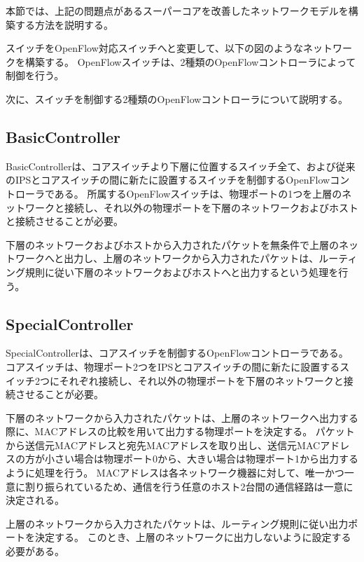 本節では、上記の問題点があるスーパーコアを改善したネットワークモデルを構築する方法を説明する。

スイッチをOpenFlow対応スイッチへと変更して、以下の図のようなネットワークを構築する。
OpenFlowスイッチは、2種類のOpenFlowコントローラによって制御を行う。


次に、スイッチを制御する2種類のOpenFlowコントローラについて説明する。

\subsection{BasicController}

BasicControllerは、コアスイッチより下層に位置するスイッチ全て、および従来のIPSとコアスイッチの間に新たに設置するスイッチを制御するOpenFlowコントローラである。
所属するOpenFlowスイッチは、物理ポートの1つを上層のネットワークと接続し、それ以外の物理ポートを下層のネットワークおよびホストと接続させることが必要。

下層のネットワークおよびホストから入力されたパケットを無条件で上層のネットワークへと出力し、上層のネットワークから入力されたパケットは、ルーティング規則に従い下層のネットワークおよびホストへと出力するという処理を行う。

\subsection{SpecialController}

SpecialControllerは、コアスイッチを制御するOpenFlowコントローラである。
コアスイッチは、物理ポート2つをIPSとコアスイッチの間に新たに設置するスイッチ2つにそれぞれ接続し、それ以外の物理ポートを下層のネットワークと接続させることが必要。

下層のネットワークから入力されたパケットは、上層のネットワークへ出力する際に、MACアドレスの比較を用いて出力する物理ポートを決定する。
パケットから送信元MACアドレスと宛先MACアドレスを取り出し、送信元MACアドレスの方が小さい場合は物理ポート0から、大きい場合は物理ポート1から出力するように処理を行う。
MACアドレスは各ネットワーク機器に対して、唯一かつ一意に割り振られているため、通信を行う任意のホスト2台間の通信経路は一意に決定される。

上層のネットワークから入力されたパケットは、ルーティング規則に従い出力ポートを決定する。
このとき、上層のネットワークに出力しないように設定する必要がある。